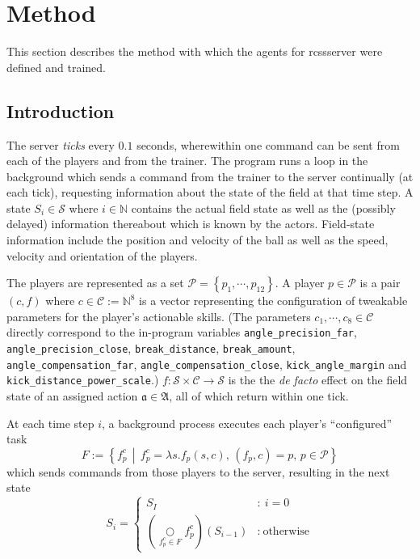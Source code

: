 \section{Method}
\label{section:method}

This section describes the method with which the agents for rcssserver were defined and trained.

\subsection{Introduction}
The server \textit{ticks} every \(0.1\) seconds, wherewithin one command can be sent from each of the players and from the trainer. The program runs a loop in the background which sends a command from the trainer to the server continually (at each tick), requesting information about the state of the field at that time step. A state \(S_i \in \mathcal{S}\) where \(i \in \mathbb{N}\) contains the actual field state as well as the (possibly delayed) information thereabout which is known by the actors. Field-state information include the position and velocity of the ball as well as the speed, velocity and orientation of the players.

The players are represented as a set \(\mathcal{P}=\left\{p_1,\cdots,p_{12}\right\}\). A player \(p \in \mathcal{P}\) is a pair \((c, f)\) where \(c \in \mathcal{C} := \mathbb{N}^8\) is a vector representing the configuration of tweakable parameters for the player's actionable skills. (The parameters \(c_1,\cdots,c_8\in \mathcal{C}\) directly correspond to the in-program variables
\texttt{angle\_precision\_far}, \texttt{angle\_precision\_close}, \texttt{break\_distance}, \texttt{break\_amount}, \texttt{angle\_compensation\_far}, \texttt{angle\_compensation\_close}, \texttt{kick\_angle\_margin} and \texttt{kick\_distance\_power\_scale}.) \(f : \mathcal{S}\times \mathcal{C} \to \mathcal{S}\) is the the \textit{de facto} effect on the field state of an assigned action \(\mathfrak{a}\in\mathfrak{A}\), all of which return within one tick.

At each time step \(i\), a background process executes each player's ``configured'' task
\[
		F := \left\{ f_p^c \,\middle|\, f_p^c = \lambda s.f_p(s, c),\, (f_p, c) = p,\, p \in\mathcal{P} \right\}
\]
which sends commands from those players to the server, resulting in the next state
\begin{equation}
		S_{i} = \left\{
			\begin{array}{cl}
				S_I & : \ i = 0 \\
				\left(\underset{f_p^c\in F}\bigcirc f_p^c\right)(S_{i-1}) & : \ \text{otherwise}
			\end{array}
		\right. %
\end{equation}

